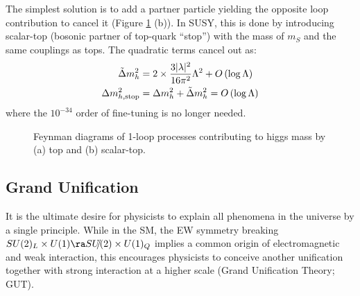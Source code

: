 The simplest solution is to add a partner particle yielding the opposite loop contribution to cancel it (Figure \ref{fig::Introduction::higgsMass_loop} (b)).
In SUSY, this is done by introducing scalar-top (bosonic partner of top-quark ``stop'') with the mass of $m_S$ and the same couplings as tops. The quadratic terms cancel out as:
\begin{align}
\tilde{\Delta} m_h ^2 & =  2 \times \frac{3|\lambda|^2}{16\pi^2} \Lambda^2 + O\,(\log\Lambda) \nonumber \\
\Delta m^2_{h, \mathrm{stop}} 
&  = \Delta m_h ^2 + \tilde{\Delta} m_h ^2  = O\,(\log\Lambda)
\label{eq::naturalness}
\end{align}
where the $10^{-34}$ order of fine-tuning is no longer needed. \\

\begin{figure}[h]
  \centering
    \caption{Feynman diagrams of 1-loop processes contributing to higgs mass by (a) top and (b) scalar-top. }
    \label{fig::Introduction::higgsMass_loop}
\end{figure}


\subsection{Grand Unification}
It is the ultimate desire for physicists to explain all phenomena in the universe by a single principle. 
While in the SM, the EW symmetry breaking $SU(2)_L \times U(1) \ra \slashed{SU(2)} \times U(1)_Q$ implies a common origin of electromagnetic and weak interaction, this encourages physicists to conceive another unification together with strong interaction at a higher scale (Grand Unification Theory; GUT). \\

